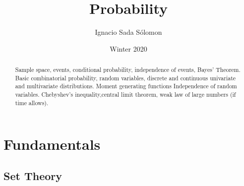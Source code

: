 \documentclass{article}
\title{Probability}
\author{Ignacio Sada S\'{o}lomon}
\date{Winter 2020}  %
\begin{document}
\clearpage\maketitle
\thispagestyle{empty}
\vspace{2cm}

\begin{abstract}
	Sample space, events, conditional probability, independence of events, Bayes' Theorem. Basic combinatorial probability, random variables, discrete and continuous univariate and multivariate distributions. Moment generating functions Independence of random variables. Chebyshev’s inequality,central limit theorem, weak law of large numbers (if time allows).
\end{abstract}

\newpage

\tableofcontents
\newpage
\setcounter{page}{1}
\cfoot{\thepage}

\section{Fundamentals}
\subsection{Set Theory}
\end{document}
